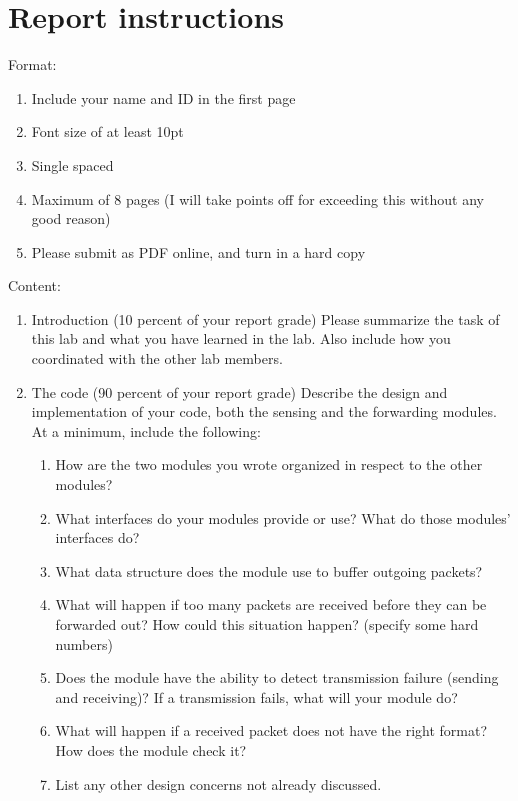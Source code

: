 \documentclass[letterpaper,12pt]{article}
\begin{document}
\section*{Report instructions}
Format:
\begin{enumerate}
   \item Include your name and ID in the first page
   \item Font size of at least 10pt
   \item Single spaced
   \item Maximum of 8 pages (I will take points off for exceeding this without any good reason)
   \item Please submit as PDF online, and turn in a hard copy
\end{enumerate}
Content:
\begin{enumerate}
   \item Introduction (10 percent of your report grade) Please summarize the task of this lab and what you have learned in the lab.
       Also include how you coordinated with the other lab members.
   \item The code (90 percent of your report grade) Describe the design and implementation
       of your code, both the sensing and the forwarding modules. At a minimum, include the
       following:
       \begin{enumerate}
           \item How are the two modules you wrote organized in respect to the other modules?
           \item What interfaces do your modules provide or use? What do those modules' interfaces do?
           \item What data structure does the module use to buffer outgoing packets?
           \item What will happen if too many packets are received before they can be forwarded out?
               How could this situation happen? (specify some hard numbers)
           \item Does the module have the ability to detect transmission failure (sending and receiving)?
              If a transmission fails, what will your module do?
           \item What will happen if a received packet does not have the right format?
              How does the module check it?
           \item List any other design concerns not already discussed.
        \end{enumerate}
\end{enumerate}
\end{document}
